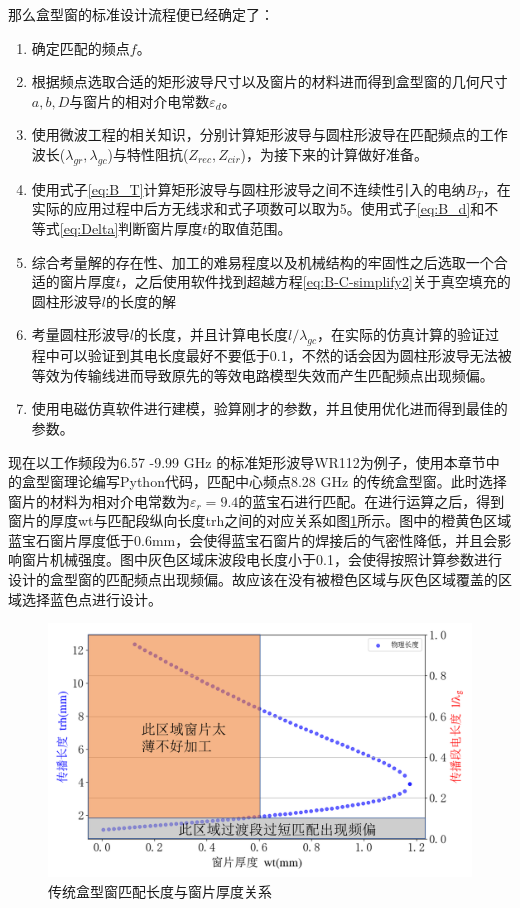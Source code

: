 \documentclass[master]{thesis-uestc}
\begin{document}
那么盒型窗的标准设计流程便已经确定了：
\begin{enumerate}
    \item 确定匹配的频点$f$。
    \item 根据频点选取合适的矩形波导尺寸以及窗片的材料进而得到盒型窗的几何尺寸$a, b, D$与窗片的相对介电常数$\varepsilon_{d}$。
    \item 使用微波工程的相关知识，分别计算矩形波导与圆柱形波导在匹配频点的工作波长($\lambda_{gr}, \lambda_{gc}$)与特性阻抗($Z_{rec}, Z_{cir}$)，为接下来的计算做好准备。
    \item 使用式子\ref{eq:B_T}计算矩形波导与圆柱形波导之间不连续性引入的电纳$B_T$，在实际的应用过程中后方无线求和式子项数可以取为5。使用式子\ref{eq:B_d}和不等式\ref{eq:Delta}判断窗片厚度$t$的取值范围。
    \item 综合考量解的存在性、加工的难易程度以及机械结构的牢固性之后选取一个合适的窗片厚度$t$，之后使用软件找到超越方程\ref{eq:B-C-simplify2}关于真空填充的圆柱形波导$l$的长度的解
    \item 考量圆柱形波导$l$的长度，并且计算电长度$l / \lambda_{gc}$，在实际的仿真计算的验证过程中可以验证到其电长度最好不要低于0.1，不然的话会因为圆柱形波导无法被等效为传输线进而导致原先的等效电路模型失效而产生匹配频点出现频偏。
    \item 使用电磁仿真软件进行建模，验算刚才的参数，并且使用优化进而得到最佳的参数。
\end{enumerate}

现在以工作频段为6.57 -9.99 GHz 的标准矩形波导WR112为例子，使用本章节中的盒型窗理论编写Python代码，匹配中心频点8.28 GHz 的传统盒型窗。此时选择窗片的材料为相对介电常数为\( \varepsilon_r = 9.4\)的蓝宝石进行匹配。在进行运算之后，得到窗片的厚度wt与匹配段纵向长度trh之间的对应关系如图\ref{fig:传统盒型窗匹配长度与窗片厚度关系}所示。图中的橙黄色区域蓝宝石窗片厚度低于0.6mm，会使得蓝宝石窗片的焊接后的气密性降低，并且会影响窗片机械强度。图中灰色区域床波段电长度小于0.1，会使得按照计算参数进行设计的盒型窗的匹配频点出现频偏。故应该在没有被橙色区域与灰色区域覆盖的区域选择蓝色点进行设计。
\begin{figure}[!htb]
    \includegraphics[width=0.65\linewidth]{pic/chapter2/传统盒型窗匹配长度与窗片厚度关系.png}
    \caption{传统盒型窗匹配长度与窗片厚度关系}
    \label{fig:传统盒型窗匹配长度与窗片厚度关系}
\end{figure}
\end{document}
